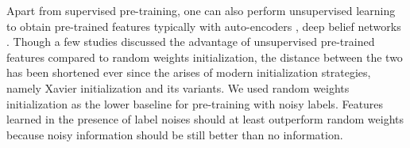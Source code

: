 


Apart from supervised pre-training, one can also perform unsupervised learning to obtain pre-trained features typically with auto-encoders \cite{vincent2010stacked,masci2011stacked}, deep belief networks \cite{hinton2006fast,lee2009convolutional}.
Though a few studies \cite{erhan2009difficulty,erhan2010does,bengio2012deep} discussed the advantage of unsupervised pre-trained features compared to random weights initialization, the distance between the two has been shortened ever since the arises of modern initialization strategies, namely Xavier initialization \cite{glorot2010understanding} and its variants.
We used random weights initialization as the lower baseline for pre-training with noisy labels.
Features learned in the presence of label noises should at least outperform random weights because noisy information should be still better than no information.

